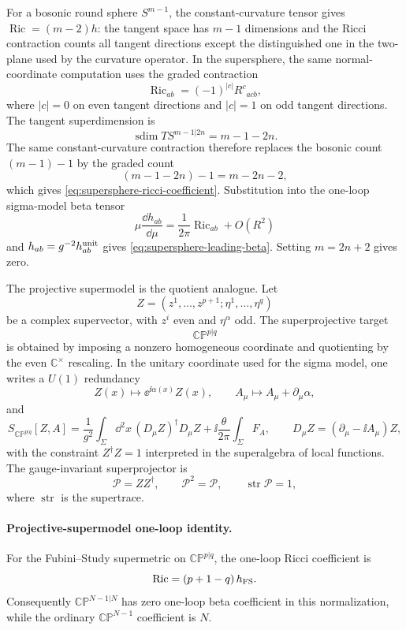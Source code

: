 For a bosonic round sphere \(S^{m-1}\), the constant-curvature tensor gives
\(\operatorname{Ric}=(m-2)h\): the tangent space has \(m-1\) dimensions and
the Ricci contraction counts all tangent directions except the distinguished
one in the two-plane used by the curvature operator.  In the supersphere,
the same normal-coordinate computation uses the graded contraction
\begin{equation}
  \operatorname{Ric}_{ab}
  =
  (-1)^{|c|}R^{c}{}_{acb},
  \label{eq:graded-ricci-contraction}
\end{equation}
where \(|c|=0\) on even tangent directions and \(|c|=1\) on odd tangent
directions.  The tangent superdimension is
\[
  \operatorname{sdim}T S^{m-1|2n}=m-1-2n.
\]
The same constant-curvature contraction therefore replaces the bosonic count
\((m-1)-1\) by the graded count
\[
  (m-1-2n)-1=m-2n-2,
\]
which gives \eqref{eq:supersphere-ricci-coefficient}.  Substitution into the
one-loop sigma-model beta tensor
\[
  \mu\frac{\dd h_{ab}}{\dd\mu}
  =
  \frac1{2\pi}\operatorname{Ric}_{ab}+O(R^2)
\]
and \(h_{ab}=g^{-2}h^{\rm unit}_{ab}\) gives
\eqref{eq:supersphere-leading-beta}.  Setting \(m=2n+2\) gives zero.

The projective supermodel is the quotient analogue.  Let
\[
  Z=(z^1,\ldots,z^{p+1};\eta^1,\ldots,\eta^q)
\]
be a complex supervector, with \(z^i\) even and \(\eta^\alpha\) odd.  The
superprojective target
\[
  \mathbb{CP}^{p|q}
\]
is obtained by imposing a nonzero homogeneous coordinate and quotienting by
the even \(\mathbb C^\times\) rescaling.  In the unitary coordinate used for
the sigma model, one writes a \(U(1)\) redundancy
\[
  Z(x)\mapsto \ee^{\ii\alpha(x)}Z(x),\qquad
  A_\mu\mapsto A_\mu+\partial_\mu\alpha,
\]
and
\begin{equation}
  S_{\mathbb{CP}^{p|q}}[Z,A]
  =
  \frac1{g^2}\int_\Sigma\dd^2x\, (D_\mu Z)^\dagger D_\mu Z
  +\ii\frac{\theta}{2\pi}\int_\Sigma F_A ,
  \qquad
  D_\mu Z=(\partial_\mu-\ii A_\mu)Z,
  \label{eq:projective-supermodel-action}
\end{equation}
with the constraint \(Z^\dagger Z=1\) interpreted in the superalgebra of
local functions.  The gauge-invariant superprojector is
\[
  \mathcal P=Z Z^\dagger,\qquad
  \mathcal P^2=\mathcal P,\qquad
  \operatorname{str}\mathcal P=1,
\]
where \(\operatorname{str}\) is the supertrace.

\paragraph{Projective-supermodel one-loop identity.}
For the Fubini--Study supermetric on \(\mathbb{CP}^{p|q}\), the one-loop
Ricci coefficient is
\begin{equation}
  \operatorname{Ric}=(p+1-q)\,h_{\rm FS}.
  \label{eq:projective-super-ricci-coefficient}
\end{equation}
Consequently \(\mathbb{CP}^{N-1|N}\) has zero one-loop beta coefficient in
this normalization, while the ordinary \(\mathbb{CP}^{N-1}\) coefficient is
\(N\).

